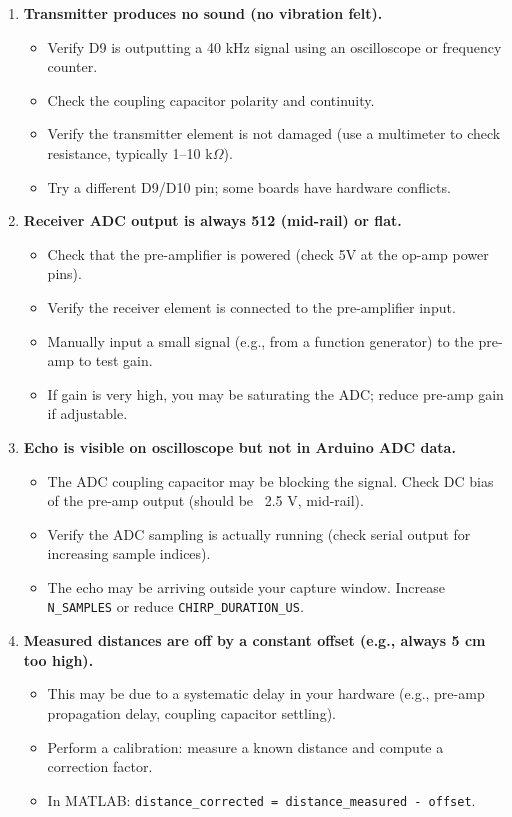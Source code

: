 \documentclass[11pt,letterpaper]{article}
\begin{document}
\begin{enumerate}
    \item \textbf{Transmitter produces no sound (no vibration felt).}
    \begin{itemize}
        \item Verify D9 is outputting a 40 kHz signal using an oscilloscope or frequency counter.
        \item Check the coupling capacitor polarity and continuity.
        \item Verify the transmitter element is not damaged (use a multimeter to check resistance, typically 1--10 k$\Omega$).
        \item Try a different D9/D10 pin; some boards have hardware conflicts.
    \end{itemize}

    \item \textbf{Receiver ADC output is always 512 (mid-rail) or flat.}
    \begin{itemize}
        \item Check that the pre-amplifier is powered (check 5V at the op-amp power pins).
        \item Verify the receiver element is connected to the pre-amplifier input.
        \item Manually input a small signal (e.g., from a function generator) to the pre-amp to test gain.
        \item If gain is very high, you may be saturating the ADC; reduce pre-amp gain if adjustable.
    \end{itemize}

    \item \textbf{Echo is visible on oscilloscope but not in Arduino ADC data.}
    \begin{itemize}
        \item The ADC coupling capacitor may be blocking the signal. Check DC bias of the pre-amp output (should be ~2.5 V, mid-rail).
        \item Verify the ADC sampling is actually running (check serial output for increasing sample indices).
        \item The echo may be arriving outside your capture window. Increase \texttt{N\_SAMPLES} or reduce \texttt{CHIRP\_DURATION\_US}.
    \end{itemize}

    \item \textbf{Measured distances are off by a constant offset (e.g., always 5 cm too high).}
    \begin{itemize}
        \item This may be due to a systematic delay in your hardware (e.g., pre-amp propagation delay, coupling capacitor settling).
        \item Perform a calibration: measure a known distance and compute a correction factor.
        \item In MATLAB: \texttt{distance\_corrected = distance\_measured - offset}.
    \end{itemize}
\end{enumerate}
\end{document}
